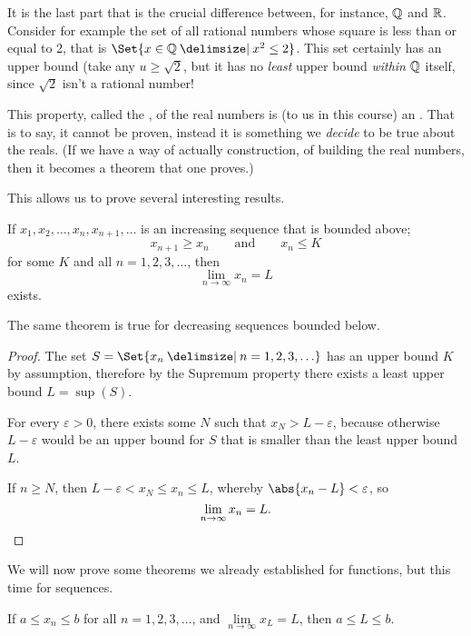 \noindent
It is the last part that is the crucial difference between, for instance, $\mathbb{Q}$ and $\mathbb{R}$.
Consider for example the set of all rational numbers whose square is less than or equal to 2, that is $\Set{x \in \Q \given x^2 \leq 2}$.
This set certainly has an upper bound (take any $u \geq \sqrt{2}$, but it has no \emph{least} upper bound \emph{within} $\mathbb{Q}$ itself, since $\sqrt{2}$ isn't a rational number!

This property, called the , of the real numbers is (to us in this course) an .
That is to say, it cannot be proven, instead it is something we \emph{decide} to be true about the reals.
(If we have a way of actually construction, of building the real numbers, then it becomes a theorem that one proves.)

This allows us to prove several interesting results.

\begin{theorem}
	If $x_1, x_2, \ldots, x_n, x_{n + 1}, \ldots$ is an increasing sequence that is bounded above;
	\[
		x_{n + 1} \geq x_n \qquad \text{and} \qquad x_n \leq K
	\]
	for some $K$ and all $n = 1, 2, 3, \ldots$, then
	\[
		\lim_{n \to \infty} x_n = L
	\]
	exists.
\end{theorem}

\noindent
The same theorem is true for decreasing sequences bounded below.

\begin{proof}
	The set $S = \Set{x_n \given n = 1, 2, 3, \ldots}$ has an upper bound $K$ by assumption, therefore by the Supremum property there exists a least upper bound $L = \sup(S)$.

	For every $\varepsilon > 0$, there exists some $N$ such that $x_N > L - \varepsilon$, because otherwise $L - \varepsilon$ would be an upper bound for $S$ that is smaller than the least upper bound $L$.

	If $n \geq N$, then $L - \varepsilon < x_N \leq x_n \leq L$, whereby $\abs{x_n - L} < \varepsilon$, so
	\[
		\lim_{n \to \infty} x_n = L. \qedhere
	\]
\end{proof}

\noindent
We will now prove some theorems we already established for functions, but this time for sequences.

\begin{theorem}\label{lec9:seqbound}
	If $a \leq x_n \leq b$ for all $n = 1, 2, 3, \ldots$, and $\lim\limits_{n \to \infty} x_L = L$, then $a \leq L \leq b$.
\end{theorem}

